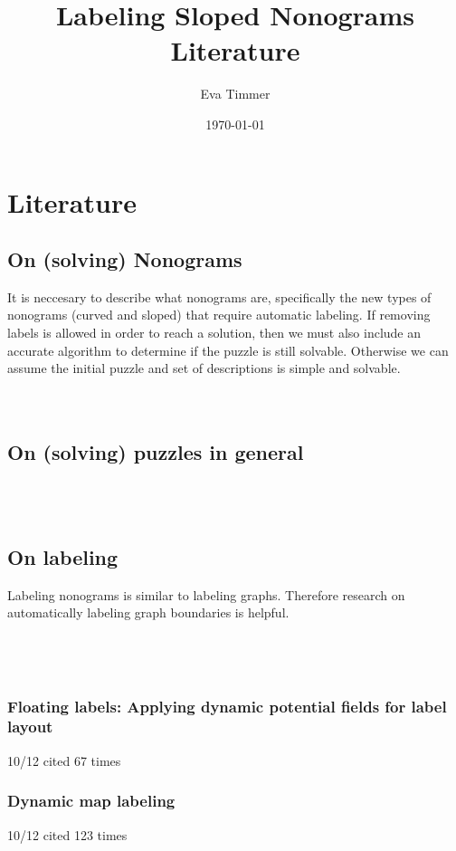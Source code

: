 \documentclass[a4paper]{article}
\title{Labeling Sloped Nonograms Literature}
\author{Eva Timmer}
\date{\today}
\begin{document}
\maketitle

\section{Literature}
\subsection{On (solving) Nonograms}
It is neccesary to describe what nonograms are, specifically the new types of nonograms (curved and sloped) that require automatic labeling. If removing labels is allowed in order to reach a solution, then we must also include an accurate algorithm to determine if the puzzle is still solvable. Otherwise we can assume the initial puzzle and set of descriptions is simple and solvable.\\
\cite{van2017improved}\\
\cite{ortiz2007automated}\\

\subsection{On (solving) puzzles in general}
\cite{salcedo2007solving}\\
\cite{smith2013quantifying}\\

\subsection{On labeling}
Labeling nonograms is similar to labeling graphs. Therefore research on automatically labeling graph boundaries is helpful.\\
\cite{boundaryLabelling}\\
\cite{Bekos:2006:PLM:1151903.1151906}\\
\cite{Gemsa:2011:BAP:2093973.2094012}\\

\subsubsection{Floating labels: Applying dynamic potential fields for label layout \cite{hartmann2004floating}}
10/12 cited 67 times

\subsubsection{Dynamic map labeling \cite{been2006dynamic}}
10/12 cited 123 times
\end{document}
